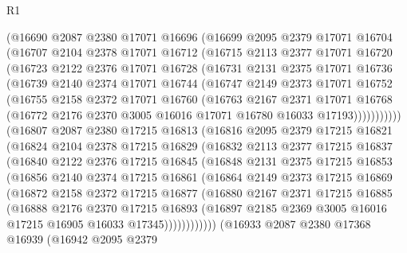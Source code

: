 \begin{lexlean}{R1}
\begin{coremodule}
    (@16690
      @2087
      @2380
      @17071
      @16696
      (@16699
        @2095
        @2379
        @17071
        @16704
        (@16707
          @2104
          @2378
          @17071
          @16712
          (@16715
            @2113
            @2377
            @17071
            @16720
            (@16723
              @2122
              @2376
              @17071
              @16728
              (@16731
                @2131
                @2375
                @17071
                @16736
                (@16739
                  @2140
                  @2374
                  @17071
                  @16744
                  (@16747
                    @2149
                    @2373
                    @17071
                    @16752
                    (@16755
                      @2158
                      @2372
                      @17071
                      @16760
                      (@16763
                        @2167
                        @2371
                        @17071
                        @16768
                        (@16772 @2176 @2370 @3005 @16016 @17071 @16780 @16033 @17193)))))))))))
    (@16807
      @2087
      @2380
      @17215
      @16813
      (@16816
        @2095
        @2379
        @17215
        @16821
        (@16824
          @2104
          @2378
          @17215
          @16829
          (@16832
            @2113
            @2377
            @17215
            @16837
            (@16840
              @2122
              @2376
              @17215
              @16845
              (@16848
                @2131
                @2375
                @17215
                @16853
                (@16856
                  @2140
                  @2374
                  @17215
                  @16861
                  (@16864
                    @2149
                    @2373
                    @17215
                    @16869
                    (@16872
                      @2158
                      @2372
                      @17215
                      @16877
                      (@16880
                        @2167
                        @2371
                        @17215
                        @16885
                        (@16888
                          @2176
                          @2370
                          @17215
                          @16893
                          (@16897 @2185 @2369 @3005 @16016 @17215 @16905 @16033 @17345))))))))))))
    (@16933
      @2087
      @2380
      @17368
      @16939
      (@16942
        @2095
        @2379

\end{coremodule}
\end{lexlean}
